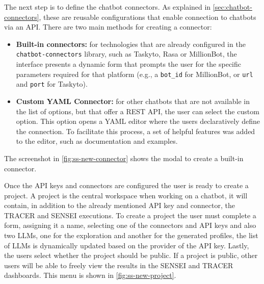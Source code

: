 The next step is to define the chatbot connectors.
As explained in \autoref{sec:chatbot-connectors},
these are reusable configurations
that enable connection to chatbots via an \ac{API}.
There are two main methods for creating a connector:
\begin{itemize}
  \item \textbf{Built-in connectors:}
    for technologies that are already configured
    in the \texttt{chatbot-connectors} library,
    such as Taskyto, Rasa or MillionBot,
    the interface presents a dynamic form
    that prompts the user for the specific parameters
    required for that platform
    (e.g., a \texttt{bot\_id} for MillionBot,
    or \texttt{url} and \texttt{port} for Taskyto).
  \item \textbf{Custom YAML Connector:}
    for other chatbots that are not available in the list of options,
    but that offer a \ac{REST} \ac{API},
    the user can select the custom option.
    This option opens a YAML editor
    where the users declaratively define the connection.
    To facilitate this process, a set of helpful features was added to the editor,
    such as documentation and examples.
\end{itemize}
The screenshot in \autoref{fig:ss-new-connector}
shows the modal to create a built-in connector.


Once the \ac{API} keys and connectors are configured
the user is ready to create a project.
A project is the central workspace when working on a chatbot,
it will contain, in addition to the already mentioned \ac{API} key and connector,
the \ac{TRACER} and SENSEI executions.
To create a project the user must complete a form,
assigning it a name, selecting one of the connectors and \ac{API} keys
and also two \acp{LLM}, one for the exploration and another for the generated profiles,
the list of \acp{LLM} is dynamically updated based on the provider of the \ac{API} key.
Lastly, the users select whether the project should be public.
If a project is public, other users will be able to freely view the results
in the SENSEI and \ac{TRACER} dashboards.
This menu is shown in \autoref{fig:ss-new-project}.

